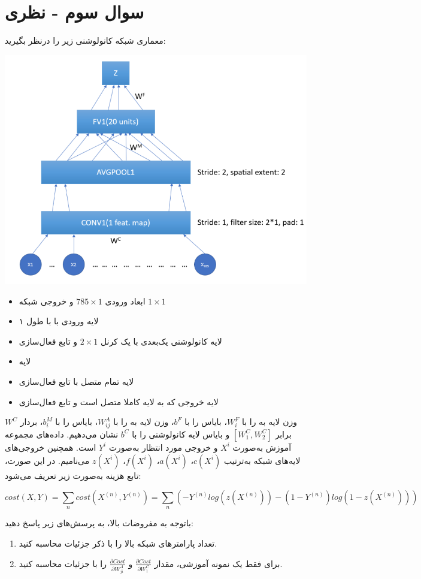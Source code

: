 \section{سوال سوم - نظری}

معماری شبکه کانولوشنی زیر را درنظر بگیرید:

\begin{center}
	\includegraphics*[width=0.6\linewidth]{pics/img1.png}
	\label{شبکه کانولوشنی مورد بررسی در سوال سوم}
\end{center}


\begin{itemize}
	\item ابعاد ورودی $785\times 1$ و خروجی شبکه $1\times 1$
	\item لایه ورودی  با  با طول ۱
	\item لایه کانولوشنی یک‌بعدی  با یک کرنل $2\times 1$ و تابع فعال‌سازی 
	\item لایه 
	\item لایه تمام متصل  با تابع فعال‌سازی 
	\item لایه خروجی  که به لایه  کاملا متصل است و تابع فعال‌سازی 
\end{itemize}



 وزن لایه  به  را با $W_i^F $، بایاس  را با $b^F$، وزن لایه  به  را با $W_{ij}^A$، بایاس  را با $b_i^M$، بردار $W^C$ برابر $[W_1^C, W_2^C]$ و بایاس لایه کانولوشنی را با $b^C$ نشان می‌دهیم. داده‌های مجموعه آموزش به‌صورت $X^i$ و خروجی مورد انتظار به‌صورت $Y^i$ است. همچنین خروجی‌های لایه‌های شبکه به‌ترتیب $c(X^i)$،
 $a(X^i)$،
 $f(X^i)$،
 $z(X^i )$
 می‌نامیم. در این صورت، تابع هزینه به‌صورت زیر تعریف می‌شود:
 
 $$ cost(X,Y)=\sum_{n} cost(X^{(n)}, Y^{(n)})=\sum_{n}(-Y^{(n)}log(z(X^{(n)}))-(1-Y^{(n)})log(1-z(X^{(n)}))) $$


باتوجه به مفروضات بالا، به پرسش‌های زیر پاسخ دهید:

\begin{enumerate}
	\item تعداد پارامتر‌های شبکه بالا را با ذکر جزئیات محاسبه کنید.
	\item برای فقط یک نمونه آموزشی، مقدار 
	$\frac{\partial Cost}{\partial W_1^C}$ و
	$\frac{\partial Cost}{\partial W_{ji}^A}$
	را با جزئیات محاسبه کنید.
\end{enumerate}





